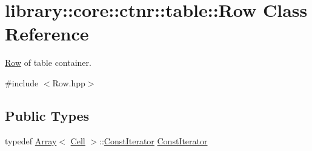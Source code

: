 \hypertarget{classlibrary_1_1core_1_1ctnr_1_1table_1_1_row}{}\section{library\+::core\+::ctnr\+::table\+::Row Class Reference}
\label{classlibrary_1_1core_1_1ctnr_1_1table_1_1_row}


\mbox{\hyperlink{classlibrary_1_1core_1_1ctnr_1_1table_1_1_row}{Row}} of table container.  




{\ttfamily \#include $<$Row.\+hpp$>$}

\subsection*{Public Types}
\begin{DoxyCompactItemize}
\item 
typedef \mbox{\hyperlink{classlibrary_1_1core_1_1ctnr_1_1_array}{Array}}$<$ \mbox{\hyperlink{namespacelibrary_1_1core_1_1ctnr_1_1table_aac6007d595b2967513e8e6b89f6092f5}{Cell}} $>$\+::\mbox{\hyperlink{classlibrary_1_1core_1_1ctnr_1_1table_1_1_row_a293725deae1bf660d85c2d3ce905cb40}{Const\+Iterator}} \mbox{\hyperlink{classlibrary_1_1core_1_1ctnr_1_1table_1_1_row_a293725deae1bf660d85c2d3ce905cb40}{Const\+Iterator}}
\end{DoxyCompactItemize}
